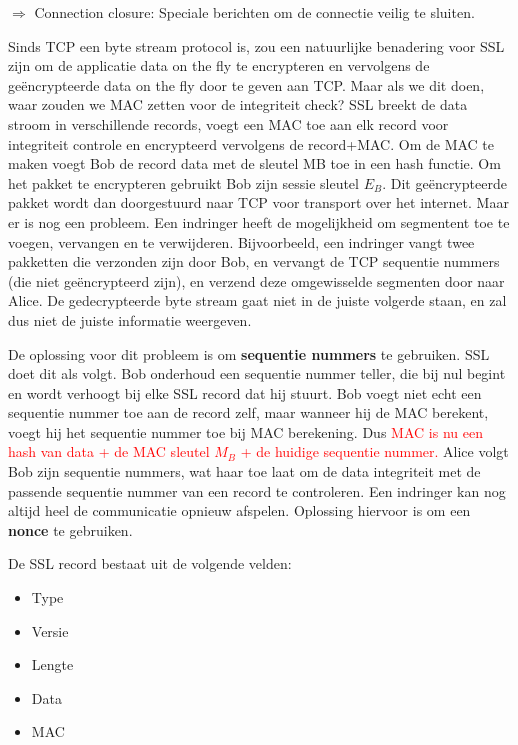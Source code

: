 $\Rightarrow$ Connection closure: Speciale berichten om de connectie veilig te sluiten.

\noindent Sinds TCP een byte stream protocol is, zou een natuurlijke benadering voor SSL zijn om de applicatie data on the fly te encrypteren en vervolgens de geëncrypteerde data on the fly door te geven aan TCP. Maar als we dit doen, waar zouden we MAC zetten voor de integriteit check?
SSL breekt de data stroom in verschillende records, voegt een MAC toe aan elk record voor integriteit controle en encrypteerd vervolgens de record+MAC. Om de MAC te maken voegt Bob de record data met de sleutel MB toe in een hash functie. Om het pakket te encrypteren gebruikt Bob zijn sessie sleutel $E_B$. Dit geëncrypteerde pakket wordt dan doorgestuurd naar TCP voor transport over het internet.
Maar er is nog een probleem. Een indringer heeft de mogelijkheid om segmentent toe te voegen, vervangen en te verwijderen. Bijvoorbeeld, een indringer vangt twee pakketten die verzonden zijn door Bob, en vervangt de TCP sequentie nummers (die niet geëncrypteerd zijn), en verzend deze omgewisselde segmenten door naar Alice.
De gedecrypteerde byte stream gaat niet in de juiste volgerde staan, en zal dus niet de juiste informatie weergeven.

\noindent De oplossing voor dit probleem is om \textbf{sequentie nummers} te gebruiken. SSL doet dit als volgt. Bob onderhoud een sequentie nummer teller, die bij nul begint en wordt verhoogt bij elke SSL record dat hij stuurt. Bob voegt niet echt een sequentie nummer toe aan de record zelf, maar wanneer hij de MAC berekent, voegt hij het sequentie nummer toe bij MAC berekening. Dus \textcolor{red}{MAC is nu een hash van data + de MAC sleutel $M_B$ + de huidige sequentie nummer.}
Alice volgt Bob zijn sequentie nummers, wat haar toe laat om de data integriteit met de passende sequentie nummer van een record te controleren.
Een indringer kan nog altijd heel de communicatie opnieuw afspelen. Oplossing hiervoor is om een \textbf{nonce} te gebruiken.




De SSL record bestaat uit de volgende velden:
\begin{itemize}

\item Type
\item Versie
\item Lengte
\item Data
\item MAC
\end{itemize}

